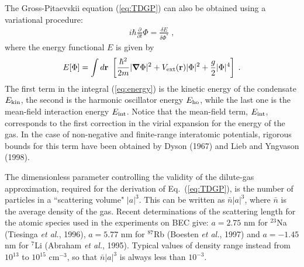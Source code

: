 The Gross-Pitaevskii equation (\ref{eq:TDGP}) can also be obtained 
using a variational procedure:
\begin{eqnarray} 
 i\hbar\frac{\partial}{\partial t} \Phi =
\frac{\delta  E}{\delta  \Phi ^*} \;,
\label{eq:varE}
 \end{eqnarray}
 where the energy functional $E$ is given by
\begin{equation}
E[\Phi] = \int d{\bf r} \  \left[ {\hbar^2 \over 2m}
|  \mbox{\boldmath$\nabla$} \Phi |^2
+  V_{\rm ext}({\bf r}) |\Phi|^2  + { g \over 2}
|\Phi|^4 \right]   \; .
\label{eq:energy}
\end{equation}
The first term in the integral (\ref{eq:energy}) is the kinetic energy
of the condensate $E_{\rm kin}$, the second is the harmonic oscillator 
energy $E_{\rm ho}$, while the last one is the mean-field interaction 
energy $E_{\rm int}$. Notice that the mean-field term, $E_{\rm int}$, 
corresponds to the first correction in the virial expansion for the
energy of the gas. In the case of non-negative and finite-range
interatomic potentials, rigorous bounds for this term have been
obtained by Dyson (1967) and Lieb and Yngvason (1998).  

The dimensionless parameter controlling the validity of the dilute-gas 
approximation, required for the derivation of Eq.~(\ref{eq:TDGP}), is 
the number of particles in a  ``scattering volume" $|a|^3$. 
This can be written  as $\bar{n} |a|^3$, 
where $\bar{n}$ is the average density of the gas. Recent determinations  
of the scattering length for the atomic species used in the experiments 
on BEC give: $a=2.75$ nm for $^{23}$Na (Tiesinga {\it et al.}, 1996), 
$a=5.77$ nm for $^{87}$Rb (Boesten {\it et al.}, 1997) and $a=-1.45$ nm 
for $^7$Li (Abraham {\it et al.}, 1995). Typical values of density range 
instead  from $10^{13}$ to $10^{15}$ cm$^{-3}$, so that $\bar{n} |a|^3$ 
is always less than $10^{-3}$. 

